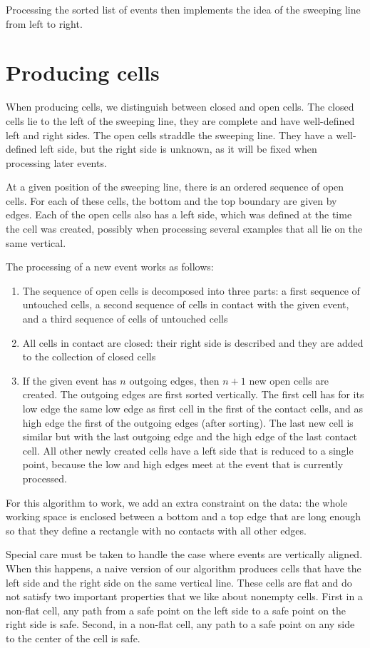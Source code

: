 \documentclass{easychair}
\begin{document}
Processing the sorted list of events then implements the idea of the
sweeping line from left to right.

\section{Producing cells}
When producing cells, we distinguish between closed and open cells.
The closed cells lie to the left of the sweeping line, they are
complete and have well-defined left and right sides.  The open cells
straddle the sweeping line.  They have a well-defined left side,
but the right side is unknown, as it will be fixed when
processing later events.

At a given position of the sweeping line, there is an ordered sequence
of open cells.  For each of these cells, the bottom and the top
boundary are given by edges.  Each of the open cells also has a
left side, which was defined at the time the cell was created,
possibly when processing several examples that all lie on the same
vertical.

The processing of a new event works as follows:
\begin{enumerate}
\item The sequence of open cells is decomposed into three parts:
a first sequence of untouched cells, a second sequence of cells in
contact with the given event, and a third sequence of cells of
untouched cells
\item All cells in contact are closed: their right side is
  described and they are added to the collection of closed cells
\item If the given event has \(n\) outgoing edges, then \(n+1\) new
  open cells are created.  The outgoing edges are first sorted vertically.
  The first cell has for its low edge the
  same low edge as first cell in the first of the contact cells, and
  as high edge the first of the outgoing edges (after sorting).  The
  last new cell is similar but with the last outgoing edge and the
  high edge of the last contact cell.  All other newly created cells have a
  left side that is reduced to a single point, because the low and
  high edges meet at the event that is currently processed.
\end{enumerate}
For this algorithm to work, we add an extra constraint on the data:
the whole working space is enclosed between a bottom and a top edge
that are long enough so that they define a rectangle with no contacts
with all other edges.

Special care must be taken to handle the case where events are
vertically aligned.  When this happens, a naive version of our
algorithm produces cells that have the left side and the right side on the
same vertical line.  These cells are flat and do not satisfy two important
properties that we like about nonempty cells.  First in a non-flat cell,
any path from a safe point on the left side to a safe point on the
right side is safe.  Second, in a non-flat cell, any path to a safe
point on any side to the center of the cell is safe.
\end{document}
